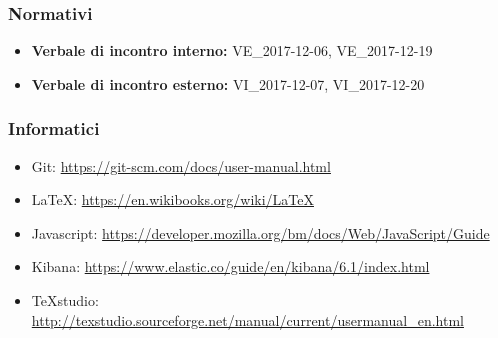 	\subsubsection{Normativi}
		\begin{itemize}
			\item \textbf{Verbale di incontro interno:} VE\_2017-12-06, VE\_2017-12-19
			\item \textbf{Verbale di incontro esterno:}	VI\_2017-12-07, VI\_2017-12-20	
		\end{itemize}
	\subsubsection{Informatici}
	\begin{itemize}
		\item Git:
		\href{https://git-scm.com/docs/user-manual.html}{https://git-scm.com/docs/user-manual.html}
		
		\item \LaTeX:  \href{https://en.wikibooks.org/wiki/LaTeX}{https://en.wikibooks.org/wiki/LaTeX}
		
		\item Javascript:
		\href{https://developer.mozilla.org/bm/docs/Web/JavaScript/Guide}{https://developer.mozilla.org/bm/docs/Web/JavaScript/Guide}
		
		\item Kibana: \href{https://www.elastic.co/guide/en/kibana/6.1/index.html}{https://www.elastic.co/guide/en/kibana/6.1/index.html}
		
		\item TeXstudio: 
		\href{http://texstudio.sourceforge.net/manual/current/usermanual\_en.html}{http://texstudio.sourceforge.net/manual/current/usermanual\_en.html}
	\end{itemize}
	